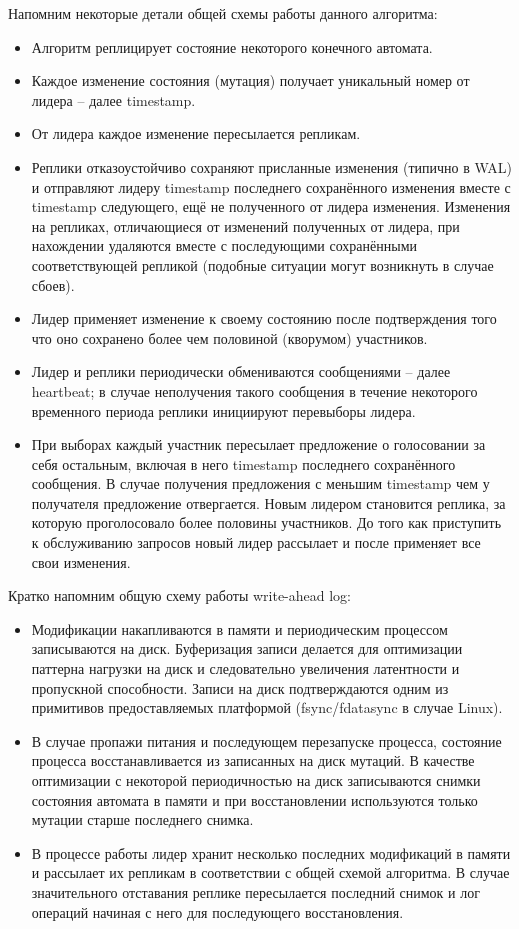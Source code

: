 \documentclass[pdftex,ptm,12pt,a4paper]{report}
\theoremstyle{definition}
\begin{document}
\label{baseline}
Напомним некоторые детали общей схемы работы данного алгоритма:
\begin{itemize}
    \item Алгоритм реплицирует состояние некоторого конечного автомата.
    \item Каждое изменение состояния (мутация) получает уникальный номер от лидера -- далее timestamp.
    \item От лидера каждое изменение пересылается репликам.
    \item Реплики отказоустойчиво сохраняют присланные изменения (типично в WAL)
        и отправляют лидеру timestamp последнего сохранённого изменения вместе с timestamp следующего, ещё не
        полученного от лидера изменения. Изменения на репликах, отличающиеся от изменений полученных от лидера, при нахождении удаляются вместе
        с последующими сохранёнными соответствующей репликой (подобные ситуации могут возникнуть в случае сбоев).
    \item Лидер применяет изменение к своему состоянию после подтверждения того что оно сохранено более чем половиной (кворумом) участников.
    \item Лидер и реплики периодически обмениваются сообщениями -- далее heartbeat; в случае неполучения такого сообщения в течение некоторого временного периода реплики инициируют перевыборы лидера.
    \item При выборах каждый участник пересылает предложение о голосовании за себя остальным, включая в него timestamp последнего сохранённого сообщения. В случае получения предложения с меньшим
    timestamp чем у получателя предложение отвергается. Новым лидером становится реплика, за которую проголосовало более половины участников. До того как приступить к обслуживанию
    запросов новый лидер рассылает и после применяет все свои изменения.
\end{itemize}

Кратко напомним общую схему работы write-ahead log:
\begin{itemize}
    \item Модификации накапливаются в памяти и периодическим процессом записываются на диск.
        Буферизация записи делается для оптимизации паттерна нагрузки на диск и следовательно увеличения латентности и пропускной способности.
        Записи на диск подтверждаются одним из примитивов предоставляемых платформой (fsync/fdatasync в случае Linux).
    \item В случае пропажи питания и последующем перезапуске процесса, состояние процесса восстанавливается из записанных на диск мутаций. В качестве оптимизации
        с некоторой периодичностью на диск записываются снимки состояния автомата в памяти и при восстановлении используются только мутации старше последнего снимка.
    \item В процессе работы лидер хранит несколько последних модификаций в памяти и рассылает их репликам в соответствии с общей схемой алгоритма.
        В случае значительного отставания реплике пересылается последний снимок и лог операций начиная с него для последующего восстановления.
\end{itemize}
\end{document}
